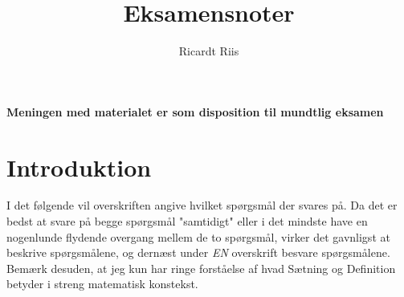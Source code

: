 \documentclass{article}
\title{Eksamensnoter}
\author{Ricardt Riis}
\begin{document}
\maketitle

\textbf{Meningen med materialet er som disposition til mundtlig eksamen}

\tableofcontents

\section*{Introduktion}
I det følgende vil overskriften angive hvilket spørgsmål der svares på. Da det
er bedst at svare på begge spørgsmål "samtidigt" eller i det mindste have en
nogenlunde flydende overgang mellem de to spørgsmål, virker det gavnligst at
beskrive spørgsmålene, og dernæst under \textit{EN} overskrift besvare
spørgsmålene.\\
Bemærk desuden, at jeg kun har ringe forståelse af hvad Sætning og Definition
betyder i streng matematisk konstekst.
\end{document}
